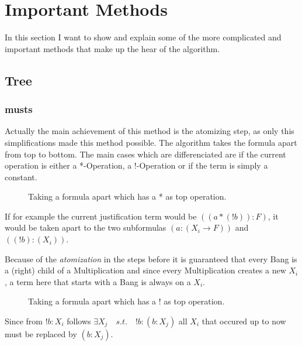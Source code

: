 \section{Important Methods}
In this section I want to show and explain some of the more complicated and important methods that make up the hear of the algorithm.

\subsection{Tree}
\subsubsection{musts}
Actually the main achievement of this method is the atomizing step, as only this simplifications made this method possible.
The algorithm takes the formula apart from top to bottom. The main cases which are differenciated are if the current operation is either a *-Operation, a !-Operation or if the term is simply a constant.

\begin{figure}[H]
    \vspace{-10pt}
	
	\vspace{-10pt}
	\caption{Taking a formula apart which has a * as top operation. }
	\vspace{-10pt}
\end{figure}
If for example the current justification term would be $((a*(!b)):F)$, it would be taken apart to the two subformulas $(a:(X_i\rightarrow F))$ and $((!b):(X_i))$.

Because of the \emph{atomization} in the steps before it is guaranteed that every Bang is a (right) child of a Multiplication and since every Multiplication creates a new $X_i$, a term here that starts with a Bang is always on a $X_i$.

\begin{figure}[H]
	\vspace{-10pt}
	
	\vspace{-10pt}
	\caption{Taking a formula apart which has a ! as top operation. }
	\vspace{-10pt}
\end{figure}

Since from $!b:X_i$ follows $\exists X_j \quad s.t. \quad !b:(b:X_j)$ all $X_i$ that occured up to now must be replaced by $(b:X_j)$.

